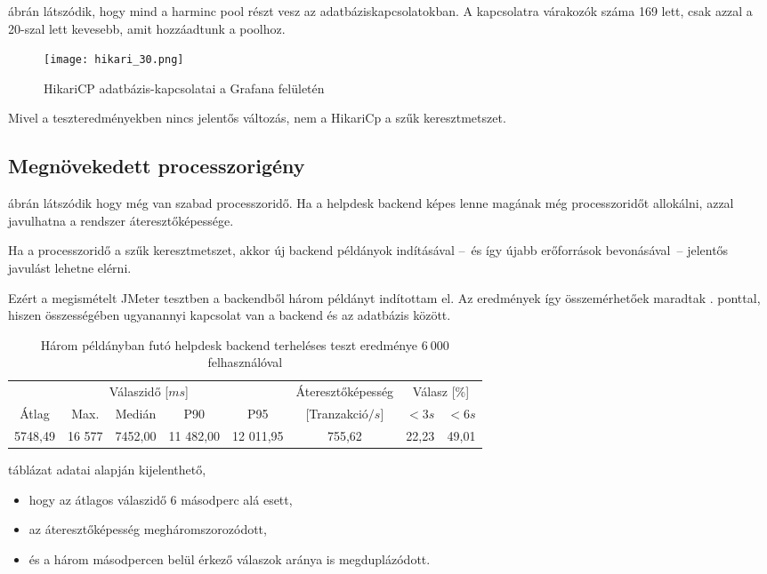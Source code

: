  ábrán látszódik, hogy mind a harminc pool részt vesz az adatbáziskapcsolatokban. A kapcsolatra várakozók száma 169 lett, csak azzal a 20-szal lett kevesebb, amit hozzáadtunk a poolhoz.


\begin{figure}[hbt] 
	\centering
	\texttt{[image: hikari\_30.png]}
	\caption{HikariCP adatbázis-kapcsolatai a Grafana felületén}
	\label{fig:hikari_30}
\end{figure}

Mivel a teszteredményekben nincs jelentős változás, nem a HikariCp a szűk keresztmetszet.

\pagebreak
\subsection{Megnövekedett processzorigény}
 ábrán látszódik hogy még van szabad processzoridő. Ha a helpdesk backend  képes lenne magának még processzoridőt allokálni, azzal javulhatna a rendszer áteresztőképessége. 

Ha a processzoridő a szűk keresztmetszet, akkor új backend példányok indításával --~és így újabb erőforrások bevonásával~--   jelentős javulást lehetne elérni.

Ezért a megismételt JMeter tesztben a backendből három példányt indítottam el. Az eredmények így összemérhetőek maradtak . ponttal, hiszen összességében ugyanannyi kapcsolat van a backend és az adatbázis között.


\begin{table}[hbt]
	
		\begin{tabular}{ccccc|c|cc}
			\multicolumn{5}{c|}{Válaszidő [$ms$]}  & Áteresztőképesség & \multicolumn{2}{c}{Válasz [\%]}	\\
			Átlag & Max. & Medián & P90 & P95 &	[Tranzakció$/s$] & $<3s$& $<6s$ \\
			\hline 
			5748,49 & 16 577 & 7452,00 & 11 482,00 & 12 011,95 & 755,62 & 22,23 & 49,01 \\
		\end{tabular} 
	
	\caption{Három példányban futó helpdesk backend terheléses teszt eredménye $6~000$ felhasználóval}
	\label{tabl:3_instance}
\end{table}


 táblázat adatai alapján kijelenthető,
\begin{itemize}
	\item hogy az átlagos válaszidő 6 másodperc alá esett,
	\item az áteresztőképesség megháromszorozódott,
	\item és a három másodpercen belül érkező válaszok aránya is megduplázódott.
\end{itemize}


